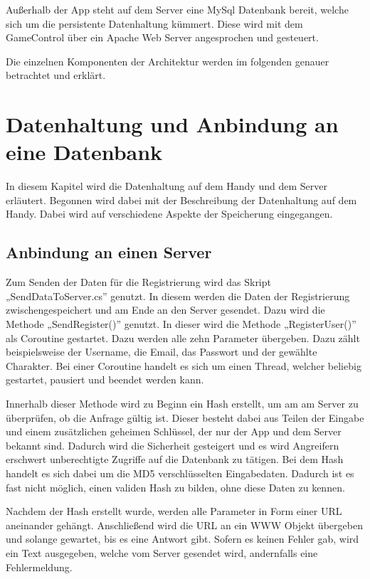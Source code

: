 		Außerhalb der App steht auf dem Server eine MySql Datenbank bereit, welche sich um die persistente Datenhaltung kümmert. Diese wird mit dem GameControl über ein Apache Web Server angesprochen und gesteuert.
		
		Die einzelnen Komponenten der Architektur werden im folgenden genauer betrachtet und erklärt.

	\section{Datenhaltung und Anbindung an eine Datenbank}
		In diesem Kapitel wird die Datenhaltung auf dem Handy und dem Server erläutert. Begonnen wird dabei mit der Beschreibung der Datenhaltung auf dem Handy. Dabei wird auf verschiedene Aspekte der Speicherung eingegangen.
		
		\subsection{Anbindung an einen Server}
			Zum Senden der Daten für die Registrierung wird das Skript „SendDataToServer.cs” genutzt. In diesem werden die Daten der Registrierung zwischengespeichert und am Ende an den Server gesendet. Dazu wird die Methode „SendRegister()” genutzt. In dieser wird die Methode „RegisterUser()” als Coroutine gestartet. Dazu werden alle zehn Parameter übergeben. Dazu zählt beispielsweise der Username, die Email, das Passwort und der gewählte Charakter. Bei einer Coroutine handelt es sich um einen Thread, welcher beliebig gestartet, pausiert und beendet werden kann.

			Innerhalb dieser Methode wird zu Beginn ein Hash erstellt, um am am Server zu überprüfen, ob die Anfrage gültig ist. Dieser besteht dabei aus Teilen der Eingabe und einem zusätzlichen geheimen Schlüssel, der nur der App und dem Server bekannt sind. Dadurch wird die Sicherheit gesteigert und es wird Angreifern erschwert unberechtigte Zugriffe auf die Datenbank zu tätigen. Bei dem Hash handelt es sich dabei um die MD5 verschlüsselten Eingabedaten. Dadurch ist es fast nicht möglich, einen validen Hash zu bilden, ohne diese Daten zu kennen.

			Nachdem der Hash erstellt wurde, werden alle Parameter in Form einer URL aneinander gehängt. Anschließend wird die URL an ein WWW Objekt übergeben und solange gewartet, bis es eine Antwort gibt. Sofern es keinen Fehler gab, wird ein Text ausgegeben, welche vom Server gesendet wird, andernfalls eine Fehlermeldung.

